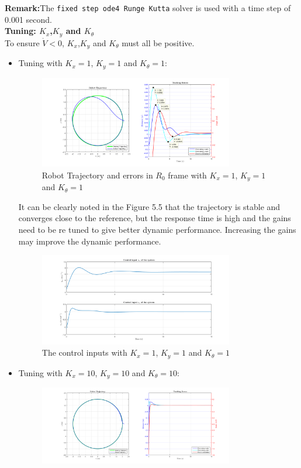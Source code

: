\documentclass{article}
\begin{document}
\textbf{Remark:}The \texttt{fixed step ode4 Runge Kutta} solver is used with a time step of 0.001 second.\\
\textbf{Tuning: $K_{x}$,$K_{y}$ and $K_{\theta}$}\\
To ensure $\dot{V}<0$, $K_{x}$,$K_{y}$ and $K_{\theta}$ must all be positive.
\begin{itemize}
\item Tuning with $K_{x}=1$, $K_{y}=1$ and $K_{\theta}=1$: 
\begin{figure}[H]
\centering
\includegraphics[width = 0.8\textwidth]{Figures/figure6.png}
\caption{Robot Trajectory and errors in $R_{0}$ frame with $K_{x}=1$, $K_{y}=1$ and $K_{\theta}=1$ }
\label{fig:figure6}
\end{figure}
It can be clearly noted in the Figure 5.5 that the trajectory is stable and converges close to the reference, but the response time is high and the gains need to be re tuned to give better dynamic performance. Increasing the gains may improve the dynamic performance.
\begin{figure}[H]
\centering
\includegraphics[width = 0.8\textwidth]{Figures/figure7.png}
\caption{The control inputs with $K_{x}=1$, $K_{y}=1$ and $K_{\theta}=1$ }
\label{fig:figure7}
\end{figure}
\item Tuning with $K_{x}=10$, $K_{y}=10$ and $K_{\theta}=10$: 
\begin{figure}[H]
\centering
\includegraphics[width = 0.8\textwidth]{Figures/figure8.png}

\end{figure}
\end{itemize}
\end{document}
